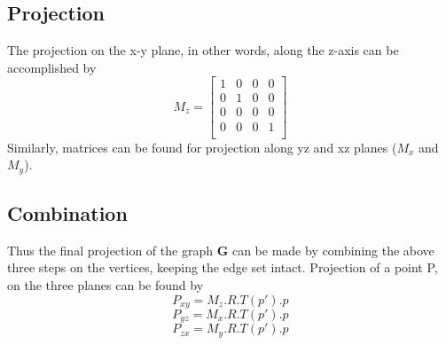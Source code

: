\documentclass{article}
\begin{document}
\subsection{Projection}
The projection on the x-y plane, in other words, along the z-axis can be accomplished by
\[M_z = \begin{bmatrix}
1&0&0&0\\
0&1&0&0\\
0&0&0&0\\
0&0&0&1\\
\end{bmatrix}\]
Similarly, matrices can be found for projection along yz and xz planes ($M_x$ and $M_y$).
\subsection{Combination}
Thus the final projection of the graph $\boldsymbol{G}$ can be made by combining the above three steps on the vertices, keeping the edge set intact.
Projection of a point P, on the three planes can be found by
\[P_{xy} = M_z.R.T(p').p\]
\[P_{yz} = M_x.R.T(p').p\]
\[P_{zx} = M_y.R.T(p').p\]
\end{document}
